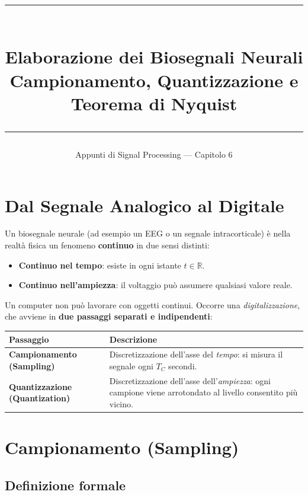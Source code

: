 \documentclass[12pt,a4paper]{article}
\title{
  \vspace{-1.5cm}
  {\color{primary}\rule{\linewidth}{2pt}}\\[0.4em]
  {\LARGE\bfseries\color{primary} Elaborazione dei Biosegnali Neurali}\\[0.3em]
  {\large\color{darkgray} Campionamento, Quantizzazione e Teorema di Nyquist}\\[0.2em]
  {\color{primary}\rule{\linewidth}{1pt}}
}
\author{\color{darkgray} Appunti di Signal Processing --- Capitolo 6}
\date{}
\begin{document}
\maketitle
\tableofcontents
\newpage

\section{Dal Segnale Analogico al Digitale}

Un biosegnale neurale (ad esempio un EEG o un segnale intracorticale) è nella realtà fisica un
fenomeno \textbf{continuo} in due sensi distinti:
\begin{itemize}
  \item \textbf{Continuo nel tempo}: esiste in ogni istante $t \in \mathbb{R}$.
  \item \textbf{Continuo nell'ampiezza}: il voltaggio può assumere qualsiasi valore reale.
\end{itemize}

Un computer non può lavorare con oggetti continui. Occorre una \textit{digitalizzazione}, che avviene
in \textbf{due passaggi separati e indipendenti}:

\begin{center}
\renewcommand{\arraystretch}{1.6}
\begin{tabular}{p{4.5cm} p{9.5cm}}
\toprule
\textbf{Passaggio} & \textbf{Descrizione} \\
\midrule
\textbf{Campionamento (Sampling)} & Discretizzazione dell'asse del \textit{tempo}: si misura il segnale ogni $T_C$ secondi. \\
\textbf{Quantizzazione (Quantization)} & Discretizzazione dell'asse dell'\textit{ampiezza}: ogni campione viene arrotondato al livello consentito più vicino. \\
\bottomrule
\end{tabular}
\end{center}

\section{Campionamento (Sampling)}

\subsection{Definizione formale}
\end{document}
